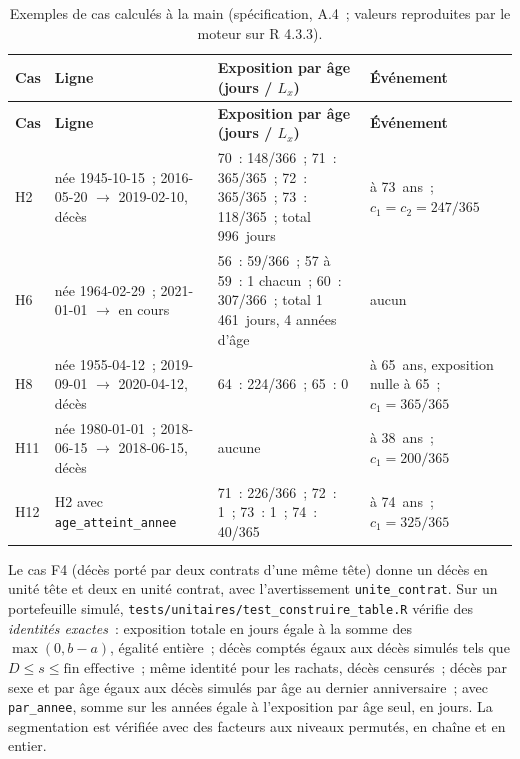 \documentclass[a4paper,11pt]{article}
\newcommand{\code}[1]{\texttt{\small #1}}
\begin{document}
{\small
{}
\begin{longtable}{@{}p{1.1cm}p{5.0cm}p{5.0cm}p{3.5cm}@{}}
\caption{Exemples de cas calculés à la main (spécification, A.4~; valeurs
reproduites par le moteur sur R 4.3.3).}
\label{tab:cas-exposition}\\
\rowcolor{tableheader}
\textcolor{financeblue}{\textbf{Cas}} &
\textcolor{financeblue}{\textbf{Ligne}} &
\textcolor{financeblue}{\textbf{Exposition par âge (jours / $L_x$)}} &
\textcolor{financeblue}{\textbf{Événement}} \\
\endfirsthead
\rowcolor{tableheader}
\textcolor{financeblue}{\textbf{Cas}} &
\textcolor{financeblue}{\textbf{Ligne}} &
\textcolor{financeblue}{\textbf{Exposition par âge (jours / $L_x$)}} &
\textcolor{financeblue}{\textbf{Événement}} \\
\endhead
H2 & née 1945-10-15~; 2016-05-20 $\to$ 2019-02-10, décès & 70~: 148/366~; 71~: 365/365~; 72~: 365/365~; 73~: 118/365~; total 996~jours & à 73~ans~; $c_1 = c_2 = 247/365$ \\
H6 & née 1964-02-29~; 2021-01-01 $\to$ en cours & 56~: 59/366~; 57 à 59~: 1 chacun~; 60~: 307/366~; total 1\,461~jours, 4 années d'âge & aucun \\
H8 & née 1955-04-12~; 2019-09-01 $\to$ 2020-04-12, décès & 64~: 224/366~; 65~: 0 & à 65~ans, exposition nulle à 65~; $c_1 = 365/365$ \\
H11 & née 1980-01-01~; 2018-06-15 $\to$ 2018-06-15, décès & aucune & à 38~ans~; $c_1 = 200/365$ \\
H12 & H2 avec \code{age\_atteint\_annee} & 71~: 226/366~; 72~: 1~; 73~: 1~; 74~: 40/365 & à 74~ans~; $c_1 = 325/365$ \\
\end{longtable}
}

\noindent
{\sloppy{} Le cas F4 (décès porté par deux contrats d'une même tête) donne un décès en
unité tête et deux en unité contrat, avec l'avertissement \code{unite\_contrat}.
Sur un portefeuille simulé, \code{tests/unitaires/test\_construire\_table.R}
vérifie des \emph{identités exactes}~: exposition totale en jours égale à la
somme des $\max(0, b - a)$, égalité entière~; décès comptés égaux aux décès
simulés tels que $D \le s \le \text{fin effective}$~; même identité pour les
rachats, décès censurés~; décès par sexe et par âge égaux aux décès simulés
par âge au dernier anniversaire~; avec \code{par\_annee}, somme sur les années
égale à l'exposition par âge seul, en jours. La segmentation est vérifiée
avec des facteurs aux niveaux permutés, en chaîne et en entier.\par}
\end{document}
